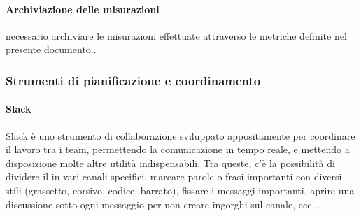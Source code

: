     		\paragraph{Archiviazione delle misurazioni} %
    		necessario archiviare le misurazioni effettuate attraverso le metriche definite nel presente documento..

    	\subsubsection{Strumenti di pianificazione e coordinamento}\label{pianificazione e coordinamento}

    		\paragraph{Slack}
			Slack è uno strumento di collaborazione sviluppato appositamente per coordinare il lavoro tra i team, permettendo la comunicazione in tempo
			reale, e mettendo a disposizione molte altre utilità indispensabili. Tra queste, c'è la possibilità di dividere il  in vari canali
			specifici, marcare parole o frasi importanti con diversi stili (grassetto, corsivo, codice, barrato), fissare i messaggi importanti, aprire una discussione
			sotto ogni messaggio per non creare ingorghi sul canale, ecc \dots

